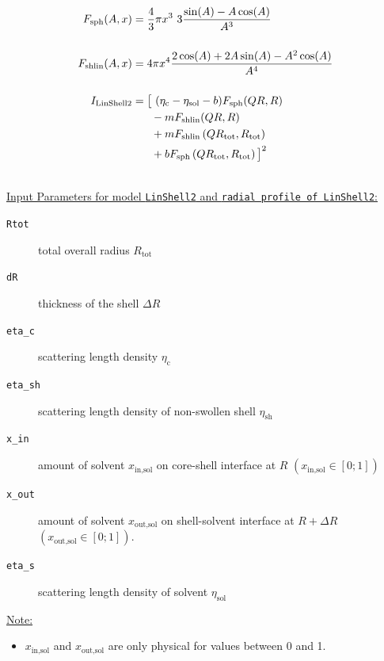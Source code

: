 \begin{align}
F_\text{sph}(A,x) & = \frac{4}{3}\pi x^3 \,\, 3\frac{\sin(A)-A\cos(A)}{A^3} \\[5mm]
F_\text{shlin}(A,x) & = 4\pi x^4 \frac{2\cos(A)+2A\sin(A)-A^2\cos(A)}{A^4} \\[5mm]
I_\text{LinShell2}    & = \big[ \,\, (\eta_\text{c}-\eta_\text{sol}-b)F_\text{sph}(QR,R) \nonumber \\
             & \hspace{6mm} - mF_\text{shlin}(QR,R) \\
             & \hspace{6mm} + mF_\text{shlin}\left(QR_\text{tot},R_\text{tot}\right) \nonumber \\
             & \hspace{6mm} + bF_\text{sph}\left(QR_\text{tot},R_\text{tot}\right) \big]^2 \nonumber
\end{align}

\vspace{5mm}

\hspace{1pt}\\
\uline{Input Parameters for model \texttt{LinShell2} and \texttt{radial profile of LinShell2}:}\\
\begin{description}
\item[\texttt{Rtot}] total overall radius $R_\text{tot}$
\item[\texttt{dR}] thickness of the shell $\Delta R$
\item[\texttt{eta\_c}] scattering length density $\eta_\text{c}$
\item[\texttt{eta\_sh}] scattering length density of non-swollen shell $\eta_\text{sh}$
\item[\texttt{x\_in}] amount of solvent $x_\text{in,sol}$ on core-shell interface at $R$ $(x_\text{in,sol} \in [0;1])$
\item[\texttt{x\_out}] amount of solvent $x_\text{out,sol}$ on shell-solvent interface at $R+\Delta R$ $(x_\text{out,sol} \in [0;1])$.
\item[\texttt{eta\_s}] scattering length density of solvent $\eta_\text{sol}$
\end{description}


\noindent\uline{Note:}
\begin{itemize}
\item $x_\text{in,sol}$ and $x_\text{out,sol}$ are only physical for values between 0 and 1.
\end{itemize}

